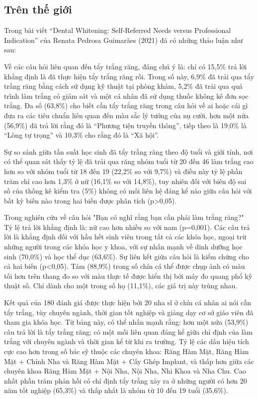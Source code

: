 \subsection{Trên thế giới}
\qquad Trong bài viết “Dental Whitening: Self-Referred Needs versus Professional Indication” của Renata Pedrosa Guimarães (2021) đã có những thảo luận như sau:\par
\quad Về các câu hỏi liên quan đến tẩy trắng răng, đáng chú ý là: chỉ có 15,5\% trả lời khẳng định là đã thực hiện tẩy trắng răng rồi. Trong số này, 6,9\% đã trải qua tẩy trắng răng bằng cách sử dụng kỹ thuật tại phòng khám, 5,2\% đã trải qua quá trình làm trắng có giám sát và một cá nhân đã sử dụng thuốc không kê đơn sọc trắng. Đa số (63,8\%) cho biết cần tẩy trắng răng trong câu hỏi về ai hoặc cái gì đưa ra các tiêu chuẩn liên quan đến màu sắc lý tưởng của nụ cười, hơn một nửa (56,9\%) đã trả lời rằng đó là “Phương tiện truyền thông”, tiếp theo là 19,0\% là “Lòng tự trọng” và 10,3\% cho rằng đó là “Xã hội”.\cite{Renata2021} \par
\quad Sự so sánh giữa tần suất học sinh đã tẩy trắng răng theo độ tuổi và giới tính, nơi có thể quan sát thấy tỷ lệ đã trải qua răng nhóm tuổi từ 20 đến 46 làm trắng cao hơn so với nhóm tuổi từ 18 đến 19 (22,2\% so với 9,7\%) và điều này tỷ lệ phần trăm chỉ cao hơn 1,3\% ở nữ (16,1\% so với 14,8\%), tuy nhiên đối với biên độ sai số của thống kê kiểm tra (5\%) không có mối liên hệ đáng kể nào giữa câu hỏi với bất kỳ biến nào trong hai biến được phân tích (p>0,05).\cite{Renata2021}\par
\quad Trong nghiên cứu về câu hỏi "Bạn có nghĩ rằng bạn cần phải làm trắng răng?" Tỷ lệ trả lời khẳng định là: nữ cao hơn nhiều so với nam (p=0,001). Các câu trả lời là khẳng định đối với hầu hết sinh viên trong tất cả các khóa học, ngoại trừ những người trong các khóa học y khoa, với sự nhấn mạnh về dinh dưỡng học sinh (70,0\%) và học thể dục (63,6\%). Sự liên kết giữa câu hỏi là
kiểm chứng cho cả hai biến (p<0,05). Tám (88,9\%) trong số chín cá thể được chụp ảnh có màu tối hơn trên thang đo so với màu thực tế được hiển thị bởi máy đo quang phổ kỹ thuật số. Chỉ dành cho một trong số họ (11,1\%), các giá trị này trùng nhau.\cite{Renata2021}\par
\quad Kết quả của 180 đánh giá được thực hiện bởi 20 nha sĩ ở chín cá nhân ai nói cần tẩy trắng, tùy chuyên ngành, thời gian tốt nghiệp và giảng dạy cơ sở giáo viên đã tham gia khóa học. Từ bảng này, có thể nhấn mạnh rằng: hơn một nửa (53,9\%) câu trả lời là tẩy trắng răng; có một mối liên quan đáng kể giữa chỉ định của làm trắng với chuyên ngành và thời gian kể từ khi ra trường. Tỷ lệ các dấu hiệu tích cực cao hơn trong số bác sỹ thuộc các chuyên khoa: Răng Hàm Mặt, Răng Hàm Mặt + Chỉnh Nha và Răng Hàm Mặt + Cấy Ghép Implant, và thấp hơn giữa các chuyên khoa Răng Hàm Mặt + Nội Nha, Nội Nha, Nhi Khoa và Nha Chu. Cao nhất phần trăm phản hồi có chỉ định tẩy trắng xảy ra ở những người có hơn 20 năm tốt nghiệp (65,3\%) và thấp nhất là nhóm từ 10 đến 19 tuổi (35,6\%).\cite{Renata2021}\par
